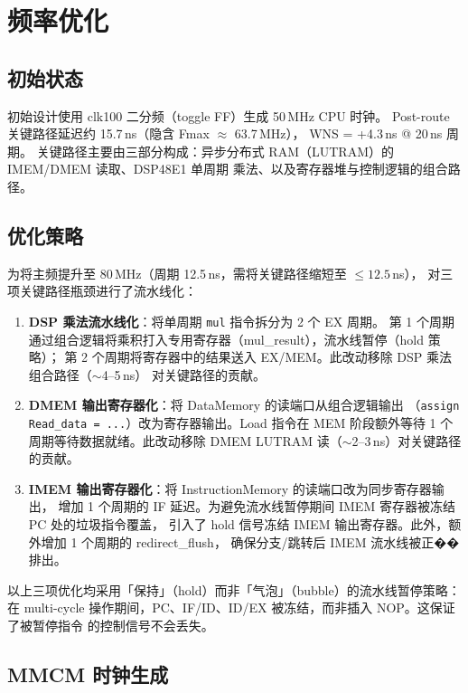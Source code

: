 \documentclass[12pt,a4paper]{ctexart}
\begin{document}
\section{频率优化}

\subsection{初始状态}

初始设计使用 clk100 二分频（toggle FF）生成 50\,MHz CPU 时钟。
Post-route 关键路径延迟约 15.7\,ns（隐含 Fmax $\approx$ 63.7\,MHz），
WNS = +4.3\,ns @ 20\,ns 周期。
关键路径主要由三部分构成：异步分布式 RAM（LUTRAM）的 IMEM/DMEM 读取、DSP48E1 单周期
乘法、以及寄存器堆与控制逻辑的组合路径。

\subsection{优化策略}

为将主频提升至 80\,MHz（周期 12.5\,ns，需将关键路径缩短至 $\leq 12.5$\,ns），
对三项关键路径瓶颈进行了流水线化：

\begin{enumerate}
  \item \textbf{DSP 乘法流水线化}：将单周期 \texttt{mul} 指令拆分为 2 个 EX 周期。
  第 1 个周期通过组合逻辑将乘积打入专用寄存器（mul\_result），流水线暂停（hold 策略）；
  第 2 个周期将寄存器中的结果送入 EX/MEM。此改动移除 DSP 乘法组合路径（$\sim$4--5\,ns）
  对关键路径的贡献。
  \item \textbf{DMEM 输出寄存器化}：将 DataMemory 的读端口从组合逻辑输出
  （\texttt{assign Read\_data = ...}）改为寄存器输出。Load 指令在 MEM 阶段额外等待
  1 个周期等待数据就绪。此改动移除 DMEM LUTRAM 读（$\sim$2--3\,ns）对关键路径的贡献。
  \item \textbf{IMEM 输出寄存器化}：将 InstructionMemory 的读端口改为同步寄存器输出，
  增加 1 个周期的 IF 延迟。为避免流水线暂停期间 IMEM 寄存器被冻结 PC 处的垃圾指令覆盖，
  引入了 hold 信号冻结 IMEM 输出寄存器。此外，额外增加 1 个周期的 redirect\_flush，
  确保分支/跳转后 IMEM 流水线被正��排出。
\end{enumerate}

以上三项优化均采用「保持」（hold）而非「气泡」（bubble）的流水线暂停策略：
在 multi-cycle 操作期间，PC、IF/ID、ID/EX 被冻结，而非插入 NOP。这保证了被暂停指令
的控制信号不会丢失。

\subsection{MMCM 时钟生成}
\end{document}

